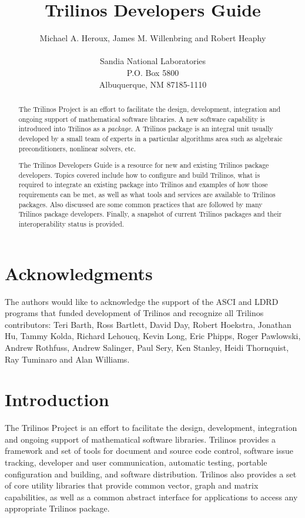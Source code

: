 \documentclass[12pt,relax]{TrilinosDevGuide}
\title{Trilinos Developers Guide}
\author{
Michael A. Heroux, James M. Willenbring and Robert Heaphy \\
 \\
Sandia National Laboratories\\
P.O. Box 5800\\
Albuquerque, NM 87185-1110
}
\date{} %
\begin{document}
\maketitle
\begin{abstract}

The Trilinos Project is an effort to facilitate the design, development,
integration and ongoing support of mathematical software libraries.
A new software capability is introduced into Trilinos as a {\it
package}.  A Trilinos package is an integral unit usually developed by
a small team of experts in a particular algorithms area such as
algebraic preconditioners, nonlinear solvers, etc.

The Trilinos Developers Guide is a resource for new and existing
Trilinos package developers.  Topics covered include how to configure and 
build Trilinos, what is required to integrate an existing package into Trilinos
and examples of how those requirements can be met, as well as what
tools and services are 
available to Trilinos packages.  Also discussed are some common practices that 
are followed by many Trilinos package developers.  Finally, a snapshot
of current Trilinos packages and their interoperability status
is provided.

\end{abstract}

\clearpage

\section*{Acknowledgments}
The authors would like to acknowledge the support of the ASCI and LDRD 
programs that funded development of Trilinos and recognize all Trilinos 
contributors: Teri Barth, Ross Bartlett, David Day, Robert Hoekstra, 
Jonathan Hu, Tammy Kolda, Richard Lehoucq, Kevin Long, Eric Phipps, 
Roger Pawlowski, Andrew Rothfuss, Andrew Salinger, Paul Sery, Ken
Stanley, Heidi Thornquist, Ray Tuminaro and Alan Williams.

\clearpage
\tableofcontents
\listoffigures
\listoftables

\clearpage


\section{Introduction}
\label{Section:Introduction}
The Trilinos Project is an effort to facilitate the design, development,
integration and ongoing support of mathematical software libraries.  Trilinos 
provides a framework and set of tools for document and source code control,
software issue tracking, developer and user communication, automatic
testing, portable configuration and building, and software
distribution.  Trilinos also provides a set of core utility libraries
that provide common vector, graph and matrix capabilities, as well as
a common abstract interface for applications to access any appropriate
Trilinos package.
\end{document}

